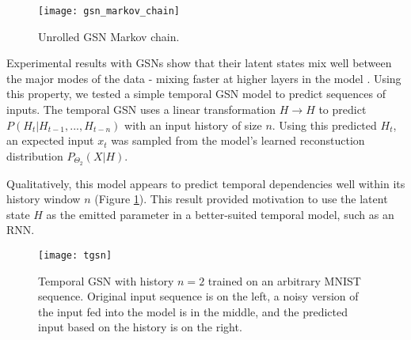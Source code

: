 \begin{figure}[h!]
  \centering
    \texttt{[image: gsn\_markov\_chain]}
\caption{Unrolled GSN Markov chain.}
\end{figure}

Experimental results with GSNs show that their latent states mix well between the major modes of the data - mixing faster at higher layers in the model \cite{gsn}. Using this property, we tested a simple temporal GSN model to predict sequences of inputs. The temporal GSN uses a linear transformation \(H \rightarrow H\) to predict \(P(H_t|H_{t-1},...,H_{t-n})\) with an input history of size \(n\). Using this predicted \(H_t\), an expected input \(x_t\) was sampled from the model's learned reconstuction distribution \(P_{\Theta_2}(X|H)\).

Qualitatively, this model appears to predict temporal dependencies well within its history window \(n\) (Figure \ref{fig:tgsn}). This result provided motivation to use the latent state \(H\) as the emitted parameter in a better-suited temporal model, such as an RNN.

\begin{figure}[h!]
  \centering
    \texttt{[image: tgsn]}
\caption{Temporal GSN with history \(n=2\) trained on an arbitrary MNIST sequence. Original input sequence is on the left, a noisy version of the input fed into the model is in the middle, and the predicted input based on the history is on the right.}\label{fig:tgsn}
\end{figure}